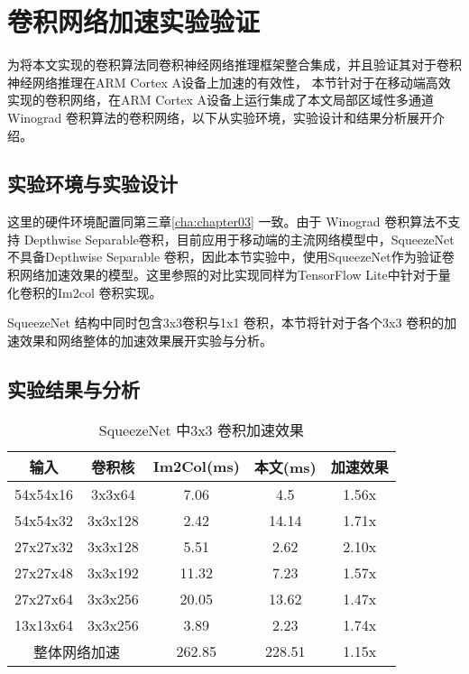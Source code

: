 \section{卷积网络加速实验验证}

为将本文实现的卷积算法同卷积神经网络推理框架整合集成，并且验证其对于卷积神经网络推理在ARM Cortex A设备上加速的有效性， 本节针对于在移动端高效实现的卷积网络，在ARM Cortex A设备上运行集成了本文局部区域性多通道Winograd 卷积算法的卷积网络，以下从实验环境，实验设计和结果分析展开介绍。

\subsection{实验环境与实验设计}

这里的硬件环境配置同第三章\ref{cha:chapter03} 一致。由于 Winograd 卷积算法不支持 Depthwise Separable卷积，目前应用于移动端的主流网络模型中，SqueezeNet\cite{SqueezeNet}不具备Depthwise Separable 卷积，因此本节实验中，使用SqueezeNet作为验证卷积网络加速效果的模型。这里参照的对比实现同样为TensorFlow Lite中针对于量化卷积的Im2col 卷积实现。

SqueezeNet 结构中同时包含3x3卷积与1x1 卷积，本节将针对于各个3x3 卷积的加速效果和网络整体的加速效果展开实验与分析。

\subsection{实验结果与分析}
\begin{table}[]
\centering
\caption{SqueezeNet 中3x3 卷积加速效果}
\begin{tabular}{ccccc}
  \toprule
  输入     & 卷积核   & Im2Col(ms) & 本文(ms) & 加速效果 \\
  \midrule
  54x54x16  & 3x3x64  & 7.06  & 4.5 & 1.56x \\
  54x54x32 & 3x3x128  & 2.42 & 14.14 & 1.71x \\
  27x27x32 & 3x3x128  & 5.51 & 2.62 & 2.10x \\
  27x27x48 & 3x3x192  & 11.32 & 7.23 & 1.57x \\
  27x27x64 & 3x3x256  & 20.05 & 13.62 & 1.47x \\
  13x13x64 & 3x3x256  & 3.89 & 2.23 & 1.74x \\
  \multicolumn{2}{c}{整体网络加速}& 262.85 & 228.51  & 1.15x \\
  \bottomrule
\end{tabular}
\label{tbl:conv_speedup}
\end{table}

